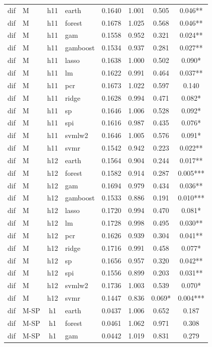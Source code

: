 \begin{ThreePartTable}
\begin{longtable}[t]{llclcccc}
\addlinespace
dif & M & h11 & earth & 0.1640 & 1.001 & 0.505 & 0.046**\\
dif & M & h11 & forest & 0.1678 & 1.025 & 0.568 & 0.046**\\
dif & M & h11 & gam & 0.1558 & 0.952 & 0.321 & 0.024**\\
dif & M & h11 & gamboost & 0.1534 & 0.937 & 0.281 & 0.027**\\
dif & M & h11 & lasso & 0.1638 & 1.000 & 0.502 & 0.090*\\
dif & M & h11 & lm & 0.1622 & 0.991 & 0.464 & 0.037**\\
dif & M & h11 & pcr & 0.1673 & 1.022 & 0.597 & 0.140\\
dif & M & h11 & ridge & 0.1628 & 0.994 & 0.471 & 0.082*\\
dif & M & h11 & sp & 0.1646 & 1.006 & 0.528 & 0.092*\\
dif & M & h11 & spi & 0.1616 & 0.987 & 0.435 & 0.076*\\
dif & M & h11 & svmlw2 & 0.1646 & 1.005 & 0.576 & 0.091*\\
dif & M & h11 & svmr & 0.1542 & 0.942 & 0.223 & 0.022**\\
\addlinespace
dif & M & h12 & earth & 0.1564 & 0.904 & 0.244 & 0.017**\\
dif & M & h12 & forest & 0.1582 & 0.914 & 0.287 & 0.005***\\
dif & M & h12 & gam & 0.1694 & 0.979 & 0.434 & 0.036**\\
dif & M & h12 & gamboost & 0.1533 & 0.886 & 0.191 & 0.010***\\
dif & M & h12 & lasso & 0.1720 & 0.994 & 0.470 & 0.081*\\
dif & M & h12 & lm & 0.1728 & 0.998 & 0.495 & 0.030**\\
dif & M & h12 & pcr & 0.1626 & 0.939 & 0.304 & 0.041**\\
dif & M & h12 & ridge & 0.1716 & 0.991 & 0.458 & 0.077*\\
dif & M & h12 & sp & 0.1656 & 0.957 & 0.320 & 0.042**\\
dif & M & h12 & spi & 0.1556 & 0.899 & 0.203 & 0.031**\\
dif & M & h12 & svmlw2 & 0.1736 & 1.003 & 0.539 & 0.070*\\
dif & M & h12 & svmr & 0.1447 & 0.836 & 0.069* & 0.004***\\
\addlinespace
dif & M-SP & h1 & earth & 0.0437 & 1.006 & 0.652 & 0.187\\
dif & M-SP & h1 & forest & 0.0461 & 1.062 & 0.971 & 0.308\\
dif & M-SP & h1 & gam & 0.0442 & 1.019 & 0.831 & 0.279\\

\end{longtable}
\end{ThreePartTable}
